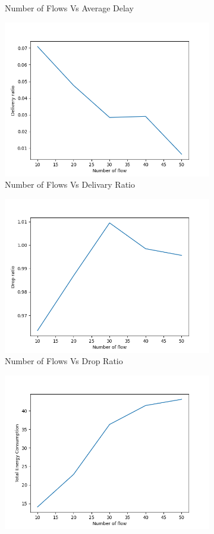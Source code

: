 \begin{figure}[h]
\begin{subfigure}{.5\textwidth}
    \caption{Number of Flows Vs Average Delay}
     \label{flow_delay}
\end{subfigure}
\begin{subfigure}{.5\textwidth}
  \centering
  \includegraphics[width=.8\linewidth]{_15_4_static/NumberofFlowvsDeliveryRatio.png}
     \caption{Number of Flows Vs Delivary Ratio}
     \label{flow_delivery}
\end{subfigure}
\begin{subfigure}{.5\textwidth}
  \centering
  \includegraphics[width=.8\linewidth]{_15_4_static/NumberofFlowvsDropRatio.png}
     \caption{Number of Flows Vs Drop Ratio}
     \label{flow_drop}
\end{subfigure}
\begin{subfigure}{.5\textwidth}
  \centering
  \includegraphics[width=.8\linewidth]{_15_4_static/NumberofFlowvsTotalEnergyConsumption.png}

\end{subfigure}
\end{figure}
